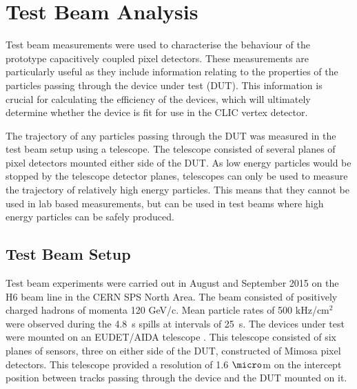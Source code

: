 
\section{Test Beam Analysis}
\label{sec:testbeam}
Test beam measurements were used to characterise the behaviour of the prototype capacitively coupled pixel detectors.  These measurements are particularly useful as they include information relating to the properties of the particles passing through the device under test (DUT).  This information is crucial for calculating the efficiency of the devices, which will ultimately determine whether the device is fit for use in the CLIC vertex detector.  

The trajectory of any particles passing through the DUT was measured in the test beam setup using a telescope.  The telescope consisted of several planes of pixel detectors mounted either side of the DUT.  As low energy particles would be stopped by the telescope detector planes, telescopes can only be used to measure the trajectory of relatively high energy particles.  This means that they cannot be used in lab based measurements, but can be used in test beams where high energy particles can be safely produced.  


\subsection{Test Beam Setup}
Test beam experiments were carried out in August and September 2015 on the H6 beam line in the CERN SPS North Area.  The beam consisted of positively charged hadrons of momenta 120 GeV/c.  Mean particle rates of 500 kHz/cm$^{2}$ were observed during the 4.8~s spills at intervals of 25~s. The devices under test were mounted on an EUDET/AIDA telescope \cite{Rubinskiy:2000287}.  This telescope consisted of six planes of sensors, three on either side of the DUT, constructed of Mimosa pixel detectors.  This telescope provided a resolution of 1.6 $\micro$m on the intercept position between tracks passing through the device and the DUT mounted on it.  


